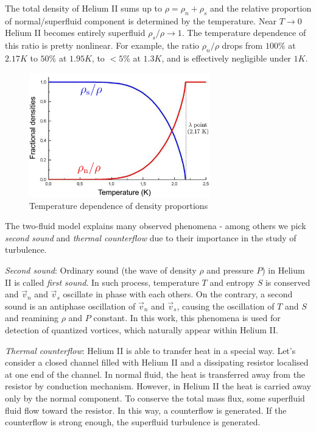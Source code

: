 	The total density of Helium II sums up to $\rho = \rho_n + \rho_s$ and the relative proportion of normal/superfluid component is determined by the temperature. Near $T \rightarrow 0$ Helium II becomes entirely superfluid $\rho_s/\rho \rightarrow 1$. The temperature dependence of this ratio is pretty nonlinear. For example, the ratio $\rho_n/\rho$ drops from $100\%$ at $2.17\unit{K}$ to $50\%$ at $1.95\unit{K}$, to $<5\%$ at $1.3\unit{K}$, and is effectively negligible under $1\unit{K}$.

	\begin{figure}[h]
		\centering
		\includegraphics[width=0.7\textwidth]{graphics/theory/densities}
		\caption{Temperature dependence of density proportions}
		\label{densities}
	\end{figure}

	The two-fluid model explains many observed phenomena - among others we pick \textit{second sound} and \textit{thermal counterflow} due to their importance in the study of turbulence.

	\textit{Second sound}: Ordinary sound (the wave of density $\rho$ and pressure $P$) in Helium II is called \textit{first sound}. In such process, temperature $T$ and entropy $S$ is conserved and $\vec{v}_n$ and $\vec{v}_s$ oscillate in phase with each others. On the contrary, a second sound is an antiphase oscillation of $\vec{v}_n$ and $\vec{v}_s$, causing the oscillation of $T$ and $S$ and reamining $\rho$ and $P$ constant. In this work, this phenomena is used for detection of quantized vortices, which naturally appear within Helium II.

	\textit{Thermal counterflow}: Helium II is able to transfer heat in a special way. Let's consider a closed channel filled with Helium II and a dissipating resistor localised at one end of the channel. In normal fluid, the heat is transferred away from the resistor by conduction mechanism. However, in Helium II the heat is carried away only by the normal component. To conserve the total mass flux, some superfluid fluid flow toward the resistor. In this way, a counterflow is generated. If the counterflow is strong enough, the superfluid turbulence is generated.

